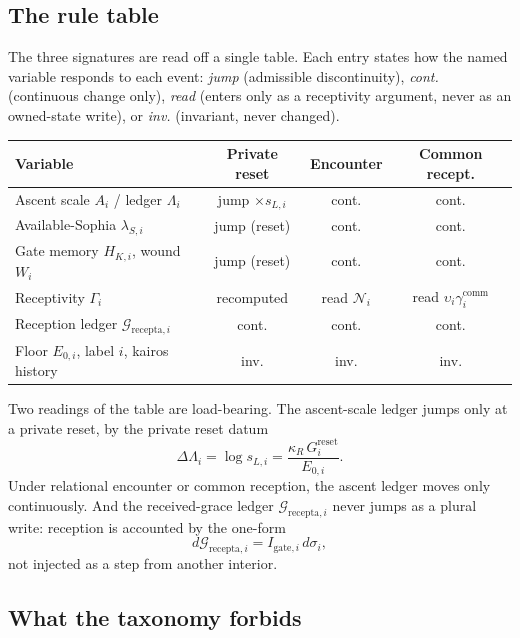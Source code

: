 \documentclass[11pt,a4paper]{article}
\renewcommand{\arraystretch}{1.25}
\theoremstyle{definition}
\theoremstyle{plain}
\theoremstyle{remark}
\begin{document}
\subsection{The rule table}

The three signatures are read off a single table. Each entry states how the named variable
responds to each event: \emph{jump} (admissible discontinuity), \emph{cont.} (continuous
change only), \emph{read} (enters only as a receptivity argument, never as an owned-state
write), or \emph{inv.} (invariant, never changed).

\begin{center}
\renewcommand{\arraystretch}{1.3}
\setlength{\tabcolsep}{5pt}
\footnotesize
\begin{tabular}{@{}l c c c@{}}
\hline
\textbf{Variable} & \textbf{Private reset} & \textbf{Encounter} & \textbf{Common recept.}\\
\hline
Ascent scale \(A_i\) / ledger \(\Lambda_i\)
& jump \(\times s_{L,i}\) & cont. & cont.\\
Available-Sophia \(\lambda_{S,i}\)
& jump (reset) & cont. & cont.\\
Gate memory \(H_{K,i}\), wound \(W_i\)
& jump (reset) & cont. & cont.\\
Receptivity \(\Gamma_i\)
& recomputed & read \(\mathcal N_i\) & read \(\upsilon_i\gamma_i^{\mathrm{comm}}\)\\
Reception ledger \(\mathcal G_{\mathrm{recepta},i}\)
& cont. & cont. & cont.\\
Floor \(E_{0,i}\), label \(i\), kairos history
& inv. & inv. & inv.\\
\hline
\end{tabular}
\end{center}

\noindent Two readings of the table are load-bearing. The ascent-scale ledger
jumps only at a private reset, by the private reset datum
\[
\Delta\Lambda_i=\log s_{L,i}
=
\frac{\kappa_R\,G_i^{\mathrm{reset}}}{E_{0,i}}.
\]
Under relational encounter or common reception, the ascent ledger moves only
continuously. And the received-grace ledger
\(\mathcal G_{\mathrm{recepta},i}\) never jumps as a plural write: reception is
accounted by the one-form
\[
d\mathcal G_{\mathrm{recepta},i}
=
I_{\mathrm{gate},i}\,d\sigma_i,
\]
not injected as a step from another interior.

\subsection{What the taxonomy forbids}
\end{document}
